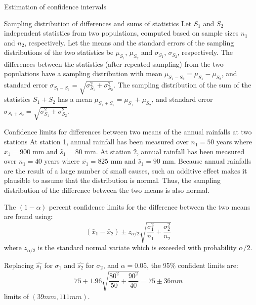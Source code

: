 \documentclass[8pt]{beamer}
\renewcommand{\emph}[1]{\textcolor{myorange}{#1}}
\begin{document}
\begin{frame}{Estimation of confidence intervals}
\begin{block}{Sampling distribution of differences and sums of statistics}
    Let $S_1$ and $S_2$ independent \emph{statistics} from two populations, computed based on sample sizes $n_1$ and $n_2$, respectively. Let the \emph{means} and the \emph{standard errors} of the sampling distributions of the two statistics  be $\mu_{S_1}$, $\mu_{S_2}$ and $\sigma_{S_1}$, $\sigma_{S_2}$, respectively. The differences between the statistics (after repeated sampling) from the two populations have a sampling distribution with mean $\mu_{S_1 - S_2} = \mu_{S_1} - \mu_{S_2}$, and standard error $\sigma_{S_1 - S_2} = \sqrt{\sigma_{S_1}^2 + \sigma_{S_2}^2}$. The sampling distribution of the sum of the statistics $S_1 + S_2$ has a mean $\mu_{S_1 + S_2} = \mu_{S_1} + \mu_{S_2}$, and standard error $\sigma_{S_1 + S_2} = \sqrt{\sigma_{S_1}^2 + \sigma_{S_2}^2}$.
\end{block}
\vspace{-7pt}
    \begin{exampleblock}{Confidence limits for differences between two means of the annual rainfalls at two stations}
        At station 1, annual rainfall has been measured over $n_1 = 50$ years where $\bar{x_1} = 900$ mm and $\hat{s}_1 =80$ mm. At station 2, annual rainfall has been measured over $n_1 = 40$ years where $\bar{x_1} = 825$ mm and $\hat{s}_1 =90$ mm. Because annual rainfalls are the result of a large number of small causes, such an additive effect makes it plausible to assume that the distribution is normal. Thus, the sampling distribution of the difference between the two means is also normal. 

\begin{minipage}[t]{0.48\textwidth}
        The $(1-\alpha)$ percent confidence limits for the difference between the two means are found using:
\vspace{-14pt}
        \[
        (\bar{x}_1 - \bar{x}_2) \pm z_{\alpha/2} \sqrt{\frac{\sigma_1^2}{n_1} + \frac{\sigma_2^2}{n_2}}
    \]
    where $z_{\alpha/2}$ is the standard  normal variate  which is exceeded with probability $\alpha/2$.  
\end{minipage}
\begin{minipage}[t]{0.45\textwidth}
    Replacing $\hat{s_1}$ for $\sigma_1$ and $\hat{s_2}$ for $\sigma_2$, and $\alpha = 0.05$, the 95\% confident limits are:
\vspace{-7pt}
    \[
        75 + 1.96 \sqrt{\frac{80^2}{50} + \frac{90^2}{40}} = 75 \pm 36 mm 
    \]
    limits of $(39 mm, 111 mm )$. 
\end{minipage}
    \end{exampleblock}

\end{frame}
\end{document}
